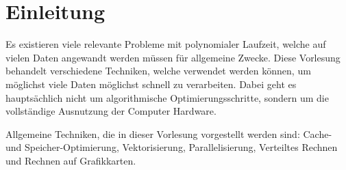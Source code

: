 \chapter{Einleitung}
Es existieren viele relevante Probleme mit polynomialer Laufzeit, welche auf vielen Daten angewandt werden müssen für allgemeine Zwecke.
Diese Vorlesung behandelt verschiedene Techniken, welche verwendet werden können, um möglichst viele Daten möglichst schnell zu verarbeiten.
Dabei geht es hauptsächlich nicht um algorithmische Optimierungsschritte, sondern um die vollständige Ausnutzung der Computer Hardware.

Allgemeine Techniken, die in dieser Vorlesung vorgestellt werden sind: Cache- und Speicher-Optimierung, Vektorisierung, Parallelisierung, Verteiltes Rechnen und Rechnen auf Grafikkarten.
